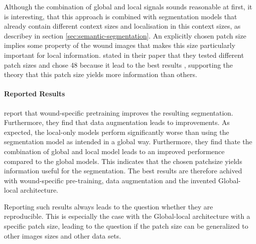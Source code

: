 Although the combination of global and local signals sounds reasonable at first, it is interesting, that this approach is combined with segmentation models that already contain different context sizes and localisation in this context sizes, as describey in section \ref{sec:semantic-segmentation}. An explicitly chosen patch size implies some property of the wound images that makes this size particularly important for local information. \citeauthor{Oota_2023_WACV} stated in their paper that they tested different patch sizes and chose 48 because it lead to the best results \cite{Oota_2023_WACV}, supporting the theory that this patch size yields more information than others.


\paragraph{Reported Results}

\citeauthor{Oota_2023_WACV} report that wound-specific pretraining improves the resulting segmentation. Furthermore, they find that data augmentation leads to improvements. As expected, the local-only models perform significantly worse than using the segmentation model as intended in a global way. Furthermore, they find thate the combination of global and local model leads to an improved performence compared to the global models. This indicates that the chosen patchsize yields information useful for the segmentation. The best results are therefore achived with wound-specific pre-training, data augmentation and the invented Global-local architecture.

Reporting such results always leads to the question whether they are reproducible. This is especially the case with the Global-local architecture with a specific patch size, leading to the question if the patch size can be generalized to other images sizes and other data sets.



